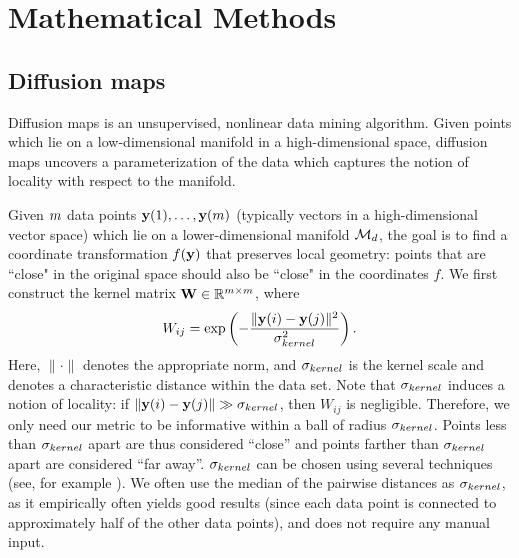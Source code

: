 \chapter{Mathematical Methods}\label{ch:math}

\section{Diffusion maps} \label{sec:dmaps}

Diffusion maps is an unsupervised, nonlinear data mining algorithm. 
%
Given points which lie on a low-dimensional manifold in a high-dimensional space, diffusion maps uncovers a parameterization of the data which captures the notion of locality with respect to the manifold. 
%

Given $m$ data points $\mathbf{y}(1), \dots, \mathbf{y}(m)$ (typically vectors in a high-dimensional vector space) which lie on a lower-dimensional manifold $\mathcal{M}_d$, the goal is to find a coordinate transformation $f(\mathbf{y})$ that preserves local geometry: points that are ``close" in the original space should also be ``close" in the coordinates $f$.
%
%
%
We first construct the kernel matrix $\mathbf{W} \in \mathbb{R}^{m \times m}$, where
\begin{equation} \label{eq:dmaps_kernel}
W_{ij} = \exp \left( -\frac{\|\mathbf{y}(i) - \mathbf{y}(j) \|^2}{\sigma_{kernel}^2} \right).
\end{equation}
Here, $\| \cdot \|$ denotes the appropriate norm, and $\sigma_{kernel}$ is the kernel scale
and denotes a characteristic distance within the data set.
%
Note that $\sigma_{kernel}$ induces a notion of locality: if $\|\mathbf{y}(i) - \mathbf{y}(j) \| \gg \sigma_{kernel}$, then $W_{ij}$ is negligible.
%
Therefore, we only need our metric to be informative within a ball of radius $\sigma_{kernel}$.
%
Points less than $\sigma_{kernel}$ apart are thus considered ``close'' and points farther than $\sigma_{kernel}$ apart are considered ``far away''.
%
$\sigma_{kernel}$ can be chosen using several techniques (see, for example \citep{coifman2008graph, rohrdanz2011determination}).
%
We often use the median of the pairwise distances as $\sigma_{kernel}$, as it empirically often yields good results (since each data point is connected to approximately half of the other data points), and does not require any manual input. 


